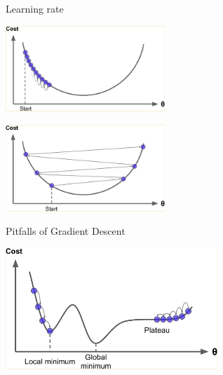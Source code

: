 \documentclass{beamer}
\begin{document}
\begin{frame}
{\centerline{Learning rate}}

\begin{center}
\includegraphics[width=6cm]{A2022.IDSEPC.RegressioneLineare/gd-2.png}
\end{center}



\begin{center}
\includegraphics[width=6cm]{A2022.IDSEPC.RegressioneLineare/gd-3.png}
\end{center}



\end{frame}
\begin{frame}
{\centerline{Pitfalls of Gradient Descent }}
\begin{center}
\includegraphics[width=8cm]{A2022.IDSEPC.RegressioneLineare/gd-4.png}
\end{center}
\end{frame}



\end{document}
